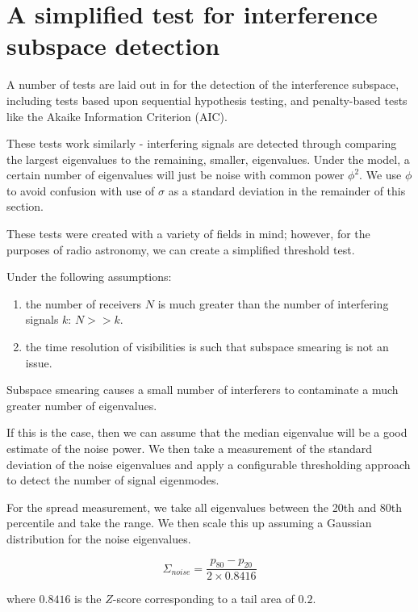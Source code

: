 \documentclass{pas}
\begin{document}
\section{A simplified test for interference subspace detection}

A number of tests are laid out in \cite{van_trees_optimum_2002} for the detection of
the interference subspace, including tests based upon sequential hypothesis testing, 
and penalty-based tests like the Akaike Information Criterion (AIC).

These tests work similarly - interfering signals are detected through comparing
the largest eigenvalues to the remaining, smaller, eigenvalues. Under the model, 
a certain number of eigenvalues will just be noise with common power $\phi^{2}$.
We use $\phi$ to avoid confusion with use of $\sigma$ as a standard deviation 
in the remainder of this section.

These tests were created with a variety of fields in mind; however, for the
purposes of radio astronomy, we can create a simplified threshold test.

Under the following assumptions:
\begin{enumerate}
    \item the number of receivers $N$ is much greater than the number of interfering signals $k$:  $N >> k$.
    \item the time resolution of visibilities is such that subspace smearing is not an issue.
\end{enumerate}

Subspace smearing causes a small number of interferers to contaminate a much greater 
number of eigenvalues.

If this is the case, then we can assume that the median eigenvalue will be a
good estimate of the noise power. We then take a measurement of the standard deviation of the 
noise eigenvalues and apply a configurable thresholding approach to detect the number of signal eigenmodes.

For the spread measurement, we take all eigenvalues between the 20th and 80th percentile and take the 
range. We then scale this up assuming a Gaussian distribution for the noise eigenvalues.

\begin{equation}
  \Sigma_{noise} = \frac{p_{80} - p_{20}}{2 \times 0.8416}
\end{equation}

where $0.8416$ is the $Z$-score corresponding to a tail area of $0.2$.
\end{document}

